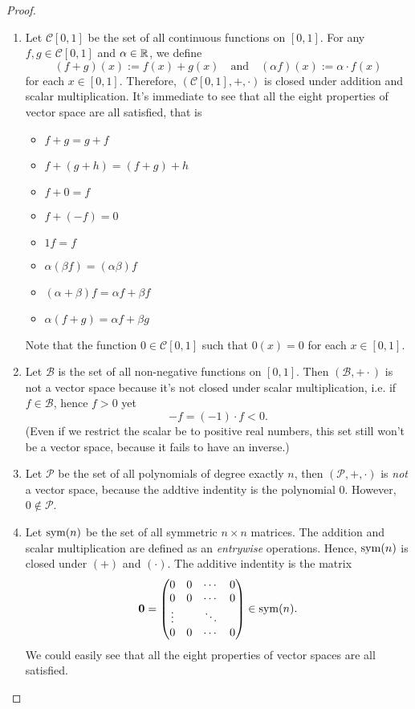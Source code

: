 \documentclass{article}
\begin{document}
\begin{proof}
  \text{}
  \begin{enumerate}
    \item Let $\mathcal{C}[0,1]$ be the set of all continuous functions
      on $[0,1]$. For any $f,g\in\mathcal{C}[0,1]$ and $\alpha\in\R$, we define
      \[
        (f+g)(x):=f(x)+g(x)
        \quad\text{and}\quad
        (\alpha f)(x):=\alpha\cdot f(x)
      \]
      for each $x\in[0,1]$. Therefore, $(\mathcal{C}[0,1], +,\cdot)$
      is closed under addition and scalar multiplication.
      It's immediate to see that all the eight properties of vector space
      are all satisfied, that is
      \begin{multicols}{2}
        \begin{itemize}
          \item $f+g=g+f$
          \item $f+(g+h)=(f+g)+h$
          \item $f+0=f$
          \item $f+(-f)=0$
          \item $1f=f$
          \item $\alpha(\beta f)=(\alpha\beta)f$
          \item $(\alpha+\beta)f=\alpha f+\beta f$
          \item $\alpha(f+g)=\alpha f+\beta g$
        \end{itemize}
      \end{multicols}
      Note that the function $0\in\mathcal{C}[0,1]$ such that
      $0(x)=0$ for each $x\in[0,1]$.
    \item Let $\mathcal{B}$ is the set of all non-negative functions on $[0,1]$.
      Then $(\mathcal{B},+\cdot)$ is not a vector space because it's not closed 
      under scalar multiplication, i.e. if $f\in\mathcal{B}$, hence $f>0$ yet
      \[-f=(-1)\cdot f<0.\]
      (Even if we restrict the scalar be to positive real numbers, this set 
      still won't be a vector space, because it fails to have an inverse.)
    \item Let $\mathcal{P}$ be the set of all polynomials of degree exactly $n$,
      then $(\mathcal{P}, +, \cdot)$ is \emph{not} a vector space, 
      because the addtive indentity is the polynomial 
      $0$. However, $0\notin\mathcal{P}$.
    \item Let $\operatorname{sym}(n)$ be the set of all symmetric $n\times n$ matrices. 
      The addition and scalar multiplication are defined as an
      \emph{entrywise} operations. Hence, $\operatorname{sym}(n)$ is closed under
      $(+)$ and $(\cdot)$. The additive indentity is the matrix 
      \[ \mathbf{0}=
        \begin{pmatrix}
          0&0&\cdots&0\\
          0&0&\cdots&0\\
          \vdots&&\ddots&\\
          0&0&\cdots&0
        \end{pmatrix}\in\operatorname{sym}(n).
      \]
      We could easily see that all the eight properties of vector spaces 
      are all satisfied.
  \end{enumerate}
\end{proof}
\end{document}
